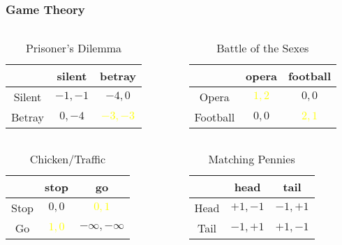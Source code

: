 \documentclass[UTF8,11pt,colorlinks,compress,openany]{beamer}%
\begin{document}
\begin{frame}\frametitle{Game Theory}
\begin{columns}
\begin{table}
\begin{tabu}{c|cc}
\hline
 & silent & betray\\
\hline
Silent & $-1,-1$ & $-4,0$\\
Betray & $0,-4$ &\textcolor{yellow}{$-3,-3$}\\
\hline
\end{tabu}\caption{Prisoner's Dilemma}
\end{table}
\begin{table}
\begin{tabu}{c|cc}
\hline
 & opera & football\\
\hline
Opera & \textcolor{yellow}{$1,2$} & $0,0$\\
Football & $0,0$ & \textcolor{yellow}{$2,1$}\\
\hline
\end{tabu}\caption{Battle of the Sexes}
\end{table}
\end{columns}
\begin{columns}
\begin{table}
\begin{tabu}{c|cc}
\hline
 & stop & go\\
\hline
Stop & $0,0$ & \textcolor{yellow}{$0,1$}\\
Go & \textcolor{yellow}{$1,0$} & $-\infty,-\infty$\\
\hline
\end{tabu}
\caption{\footnotesize Chicken/Traffic}
\end{table}
\begin{table}
\begin{tabu}{c|cc}
\hline
 & head & tail\\
\hline
Head & $+1,-1$ & $-1,+1$\\
Tail & $-1,+1$ & $+1,-1$\\
\hline
\end{tabu}\caption{Matching Pennies}
\end{table}
\end{columns}
\end{frame}
\end{document}
